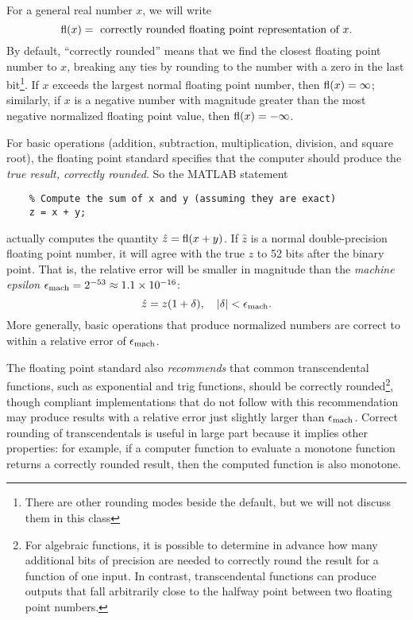 \documentclass[12pt, leqno]{article} %
\begin{document}
For a general real number $x$, we will write
\[
  \operatorname{fl}(x) = \mbox{ correctly rounded floating point representation of } x.
\]
By default, ``correctly rounded'' means that we find the closest
floating point number to $x$, breaking any ties by rounding to the
number with a zero in the last bit\footnote{%
There are other rounding modes beside the default, but we will not
discuss them in this class}.
If $x$ exceeds the largest normal floating point number,
then $\operatorname{fl}(x) = \infty$; similarly, if $x$ is a negative number
with magnitude greater than the most negative normalized floating
point value, then $\operatorname{fl}(x) = -\infty$.

For basic operations (addition, subtraction, multiplication,
division, and square root), the floating point standard specifies that
the computer should produce the {\em true result, correctly rounded}.
So the MATLAB statement
\lstset{language=matlab,columns=flexible}
\begin{lstlisting}
    % Compute the sum of x and y (assuming they are exact)
    z = x + y;
\end{lstlisting}
actually computes the quantity $\hat{z} = \operatorname{fl}(x+y)$.  If $\hat{z}$ is
a normal double-precision floating point number, it will agree with
the true $z$ to 52 bits after the binary point.  That is, the relative
error will be smaller in magnitude than the {\em machine epsilon}
$\epsilon_{\mathrm{mach}} = 2^{-53} \approx 1.1 \times 10^{-16}$:
\[
  \hat{z} = z(1+\delta), \quad |\delta| < \epsilon_{\mathrm{mach}}.
\]
More generally, basic operations that produce normalized numbers are
correct to within a relative error of $\epsilon_{\mathrm{mach}}$.

The floating
point standard also {\em recommends} that common transcendental functions,
such as exponential and trig functions, should be correctly rounded\footnote{%
For algebraic functions, it is possible to determine in advance how many
additional bits of precision are needed to correctly round the result
for a function of one input.  In contrast, transcendental functions
can produce outputs that fall arbitrarily close to the halfway point
between two floating point numbers.
},
though compliant implementations that do not follow with this
recommendation may produce results with a relative error
just slightly larger than $\epsilon_{\mathrm{mach}}$.
Correct rounding of transcendentals is useful in large part because it
implies other properties: for example, if a computer function to evaluate
a monotone function returns a correctly rounded result, then the computed
function is also monotone.
\end{document}
